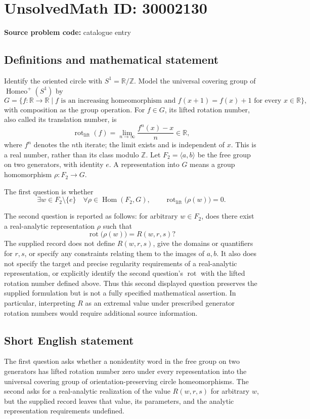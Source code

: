 \documentclass[11pt]{article}
\newcommand{\Z}{\mathbb{Z}}
\newcommand{\R}{\mathbb{R}}
\begin{document}
\section*{UnsolvedMath ID: 30002130}
\textbf{Source problem code:} catalogue entry
\subsection{Definitions and mathematical statement}
Identify the oriented circle with $S^1=\R/\Z$. Model the universal covering group of $\operatorname{Homeo}^+(S^1)$ by
\[
G=\{f:\R\to\R\mid f\text{ is an increasing homeomorphism and }f(x+1)=f(x)+1\text{ for every }x\in\R\},
\]
with composition as the group operation. For $f\in G$, its lifted rotation number, also called its translation number, is
\[
\operatorname{rot}_{\mathrm{lift}}(f)=\lim_{n\to\infty}\frac{f^n(x)-x}{n}\in\R,
\]
where $f^n$ denotes the $n$th iterate; the limit exists and is independent of $x$. This is a real number, rather than its class modulo $\Z$. Let $F_2=\langle a,b\rangle$ be the free group on two generators, with identity $e$. A representation into $G$ means a group homomorphism $\rho:F_2\to G$.

The first question is whether
\[
\exists w\in F_2\setminus\{e\}\quad\forall\rho\in\operatorname{Hom}(F_2,G),\qquad
\operatorname{rot}_{\mathrm{lift}}\bigl(\rho(w)\bigr)=0.
\]

The second question is reported as follows: for arbitrary $w\in F_2$, does there exist a real-analytic representation $\rho$ such that
\[
\operatorname{rot}\bigl(\rho(w)\bigr)=R(w,r,s)?
\]
The supplied record does not define $R(w,r,s)$, give the domains or quantifiers for $r,s$, or specify any constraints relating them to the images of $a,b$. It also does not specify the target and precise regularity requirements of a real-analytic representation, or explicitly identify the second question's $\operatorname{rot}$ with the lifted rotation number defined above. Thus this second displayed question preserves the supplied formulation but is not a fully specified mathematical assertion. In particular, interpreting $R$ as an extremal value under prescribed generator rotation numbers would require additional source information.
\subsection{Short English statement}
The first question asks whether a nonidentity word in the free group on two generators has lifted rotation number zero under every representation into the universal covering group of orientation-preserving circle homeomorphisms. The second asks for a real-analytic realization of the value $R(w,r,s)$ for arbitrary $w$, but the supplied record leaves that value, its parameters, and the analytic representation requirements undefined.
\end{document}
